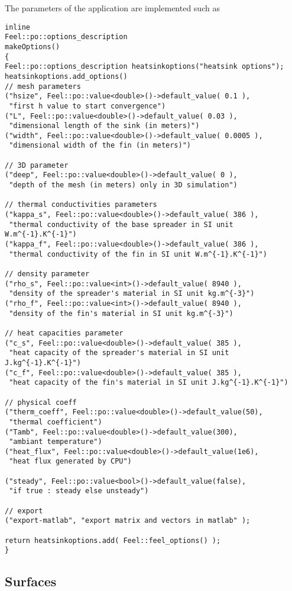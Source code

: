 The parameters of the application are implemented such as 
\begin{lstlisting}
inline
Feel::po::options_description
makeOptions()
{
Feel::po::options_description heatsinkoptions("heatsink options");
heatsinkoptions.add_options()
// mesh parameters
("hsize", Feel::po::value<double>()->default_value( 0.1 ),
 "first h value to start convergence")
("L", Feel::po::value<double>()->default_value( 0.03 ),
 "dimensional length of the sink (in meters)")
("width", Feel::po::value<double>()->default_value( 0.0005 ),
 "dimensional width of the fin (in meters)")

// 3D parameter
("deep", Feel::po::value<double>()->default_value( 0 ),
 "depth of the mesh (in meters) only in 3D simulation")

// thermal conductivities parameters
("kappa_s", Feel::po::value<double>()->default_value( 386 ),
 "thermal conductivity of the base spreader in SI unit W.m^{-1}.K^{-1}")
("kappa_f", Feel::po::value<double>()->default_value( 386 ),
 "thermal conductivity of the fin in SI unit W.m^{-1}.K^{-1}")

// density parameter
("rho_s", Feel::po::value<int>()->default_value( 8940 ),
 "density of the spreader's material in SI unit kg.m^{-3}")
("rho_f", Feel::po::value<int>()->default_value( 8940 ),
 "density of the fin's material in SI unit kg.m^{-3}")

// heat capacities parameter
("c_s", Feel::po::value<double>()->default_value( 385 ),
 "heat capacity of the spreader's material in SI unit J.kg^{-1}.K^{-1}")
("c_f", Feel::po::value<double>()->default_value( 385 ),
 "heat capacity of the fin's material in SI unit J.kg^{-1}.K^{-1}")

// physical coeff
("therm_coeff", Feel::po::value<double>()->default_value(50),
 "thermal coefficient")
("Tamb", Feel::po::value<double>()->default_value(300),
 "ambiant temperature")
("heat_flux", Feel::po::value<double>()->default_value(1e6),
 "heat flux generated by CPU")

("steady", Feel::po::value<bool>()->default_value(false), 
 "if true : steady else unsteady")

// export
("export-matlab", "export matrix and vectors in matlab" );

return heatsinkoptions.add( Feel::feel_options() );
}
\end{lstlisting}

\subsection{Surfaces}


